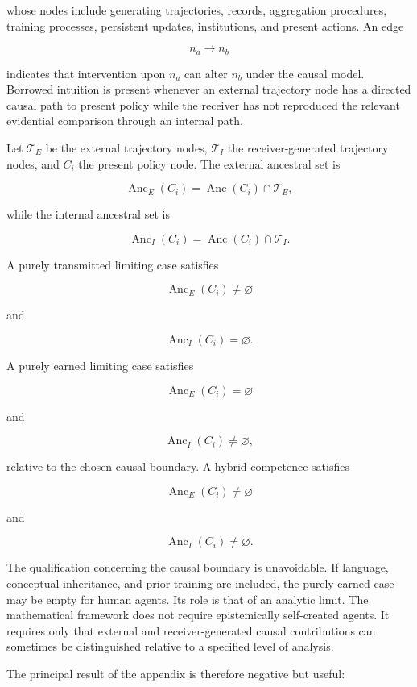\documentclass[11pt]{article}
\begin{document}
whose nodes include generating trajectories, records, aggregation procedures, training processes, persistent updates, institutions, and present actions. An edge

\[
n_a\to n_b
\]

indicates that intervention upon $n_a$ can alter $n_b$ under the causal model. Borrowed intuition is present whenever an external trajectory node has a directed causal path to present policy while the receiver has not reproduced the relevant evidential comparison through an internal path.

Let $\mathcal{T}_E$ be the external trajectory nodes, $\mathcal{T}_I$ the receiver-generated trajectory nodes, and $C_i$ the present policy node. The external ancestral set is

\[
\operatorname{Anc}_E(C_i)
=
\operatorname{Anc}(C_i)\cap\mathcal{T}_E,
\]

while the internal ancestral set is

\[
\operatorname{Anc}_I(C_i)
=
\operatorname{Anc}(C_i)\cap\mathcal{T}_I.
\]

A purely transmitted limiting case satisfies

\[
\operatorname{Anc}_E(C_i)\neq\varnothing
\]

and

\[
\operatorname{Anc}_I(C_i)=\varnothing.
\]

A purely earned limiting case satisfies

\[
\operatorname{Anc}_E(C_i)=\varnothing
\]

and

\[
\operatorname{Anc}_I(C_i)\neq\varnothing,
\]

relative to the chosen causal boundary. A hybrid competence satisfies

\[
\operatorname{Anc}_E(C_i)\neq\varnothing
\]

and

\[
\operatorname{Anc}_I(C_i)\neq\varnothing.
\]

The qualification concerning the causal boundary is unavoidable. If language, conceptual inheritance, and prior training are included, the purely earned case may be empty for human agents. Its role is that of an analytic limit. The mathematical framework does not require epistemically self-created agents. It requires only that external and receiver-generated causal contributions can sometimes be distinguished relative to a specified level of analysis.

The principal result of the appendix is therefore negative but useful:
\end{document}
